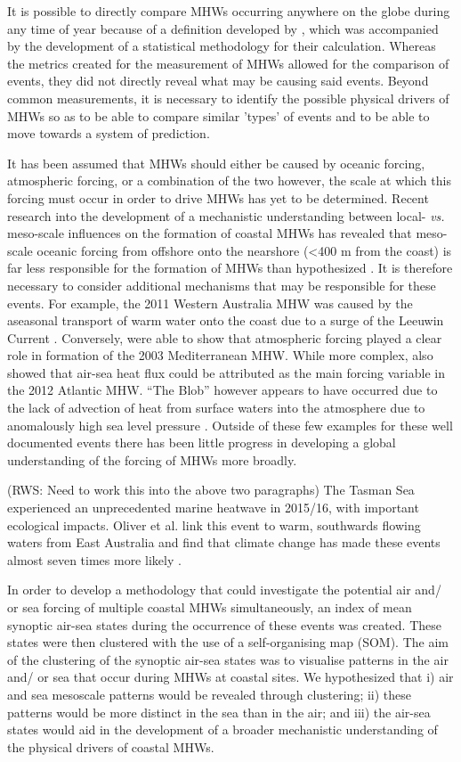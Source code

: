 \documentclass[a4paper,10pt,review]{elsarticle}
\begin{document}
It is possible to directly compare MHWs occurring anywhere on the globe during any time of year because of a definition developed by \citet{Hobday2016}, which was accompanied by the development of a statistical methodology for their calculation. Whereas the metrics created for the measurement of MHWs allowed for the comparison of events, they did not directly reveal what may be causing said events. Beyond common measurements, it is necessary to identify the possible physical drivers of MHWs so as to be able to compare similar 'types' of events and to be able to move towards a system of prediction. 

It has been assumed that MHWs should either be caused by oceanic forcing, atmospheric forcing, or a combination of the two however, the scale at which this forcing must occur in order to drive MHWs has yet to be determined. Recent research into the development of a mechanistic understanding between local- \emph{vs.} meso-scale influences on the formation of coastal MHWs has revealed that meso-scale oceanic forcing from offshore onto the nearshore (<400 m from the coast) is far less responsible for the formation of MHWs than hypothesized \citep{Schlegel2017}. It is therefore necessary to consider additional mechanisms that may be responsible for these events. For example, the 2011 Western Australia MHW \citep{Pearce2013} was caused by the aseasonal transport of warm water onto the coast due to a surge of the Leeuwin Current \citep{Feng2013, Benthuysen2014}. Conversely, \citet{Garrabou2009} were able to show that atmospheric forcing played a clear role in formation of the 2003 Mediterranean MHW. While more complex, \citet{Chen2015a} also showed that air-sea heat flux could be attributed as the main forcing variable in the 2012 Atlantic MHW. ``The Blob'' however appears to have occurred due to the lack of advection of heat from surface waters into the atmosphere due to anomalously high sea level pressure \citep{Bond2015a}. Outside of these few examples for these well documented events there has been little progress in developing a global understanding of the forcing of MHWs more broadly.

(RWS: Need to work this into the above two paragraphs)
The Tasman Sea experienced an unprecedented marine heatwave in 2015/16, with important ecological impacts. Oliver et al. link this event to warm, southwards flowing waters from East Australia and find that climate change has made these events almost seven times more likely \citep{Oliver2017}.

In order to develop a methodology that could investigate the potential air and/ or sea forcing of multiple coastal MHWs simultaneously, an index of mean synoptic air-sea states during the occurrence of these events was created. These states were then clustered with the use of a self-organising map (SOM). The aim of the clustering of the synoptic air-sea states was to visualise patterns in the air and/ or sea that occur during MHWs at coastal sites. We hypothesized that i) air and sea mesoscale patterns would be revealed through clustering; ii) these patterns would be more distinct in the sea than in the air; and iii) the air-sea states would aid in the development of a broader mechanistic understanding of the physical drivers of coastal MHWs.
\end{document}

